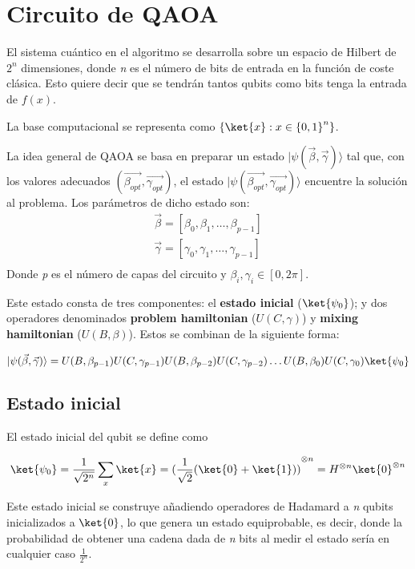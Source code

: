 \section{Circuito de QAOA\label{sec:3-circuito de qaoa}}
El sistema cuántico en el algoritmo se desarrolla sobre un espacio de Hilbert de $2^n$ dimensiones, donde \textit{n} es el número de bits de entrada en la función de coste clásica. Esto quiere decir que se tendrán tantos qubits como bits tenga la entrada de $f(x)$.

La base computacional se representa como $\{\ket{x} : x \in {\{0, 1\}}^n\}$.

La idea general de QAOA se basa en preparar un estado \(\lvert \psi(\vec{\beta}, \vec{\gamma})\rangle\) tal que, con los valores adecuados \( (\vec{\beta_{opt}}, \vec{\gamma_{opt}}) \), el estado \(\lvert\psi(\vec{\beta_{opt}}, \vec{\gamma_{opt}})\rangle\) encuentre la solución al problema. Los parámetros de dicho estado son:
\begin{align*}
  \vec{\beta} = [\beta_0, \beta_1, \ldots , \beta_{p-1}] \\
  \vec{\gamma} = [\gamma_0, \gamma_1, \ldots , \gamma_{p-1}] \\
\end{align*}
Donde \textit{p} es el número de capas del circuito y $\beta_i, \gamma_i \in{[0, 2\pi]}$.

Este estado consta de tres componentes: el \textbf{estado inicial} ($\ket{\psi_0}$); y dos operadores denominados \textbf{problem hamiltonian} ($U(C, \gamma)$) y \textbf{mixing hamiltonian} ($U(B, \beta)$).
Estos se combinan de la siguiente forma:

\[
  \lvert\psi(\vec{\beta}, \vec{\gamma})\rangle = U(B, \beta_{p-1})U(C, \gamma_{p-1})U(B, \beta_{p-2})U(C, \gamma_{p-2}) \ldots U(B, \beta_0)U(C, \gamma_0) \ket{\psi_0}
\]

\subsection{Estado inicial}
El estado inicial del qubit se define como

\begin{align*}
  \ket{\psi_0} = \frac{1}{\sqrt{2^n}} \sum_x\ket{x}
  = {(\frac{1}{\sqrt{2}} (\ket{0} + \ket{1}))}^{\otimes n}
  = H^{\otimes n} \ket{0}^{\otimes n}
\end{align*}

Este estado inicial se construye añadiendo operadores de Hadamard a \textit{n} qubits inicializados a $\ket{0}$, lo que genera un estado equiprobable, es decir, donde la probabilidad de obtener una cadena dada de \textit{n} bits al medir el estado sería en cualquier caso $\frac{1}{2^n}$.

